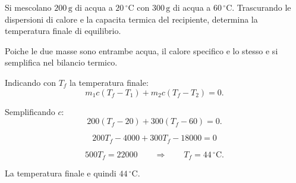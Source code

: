 
\begin{esercizio}
Si mescolano $200\,\mathrm{g}$ di acqua a $20\,^\circ\mathrm{C}$ con
$300\,\mathrm{g}$ di acqua a $60\,^\circ\mathrm{C}$. Trascurando le dispersioni
di calore e la capacita termica del recipiente, determina la temperatura finale
di equilibrio.
\end{esercizio}

\begin{soluzione}
Poiche le due masse sono entrambe acqua, il calore specifico e lo stesso e si
semplifica nel bilancio termico.

Indicando con $T_f$ la temperatura finale:
\[
m_1 c (T_f-T_1)+m_2 c (T_f-T_2)=0.
\]

Semplificando $c$:
\[
200(T_f-20)+300(T_f-60)=0.
\]

\[
200T_f-4000+300T_f-18000=0
\]

\[
500T_f=22000
\qquad\Rightarrow\qquad
T_f=44\,^\circ\mathrm{C}.
\]

La temperatura finale e quindi $44\,^\circ\mathrm{C}$.
\end{soluzione}
